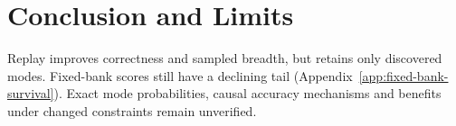 \section{Conclusion and Limits}
\label{sec:conclusion}\label{sec:discussion}\label{sec:limitations}
Replay improves correctness and sampled breadth, but retains only discovered
modes. Fixed-bank scores still have a declining tail
(Appendix~\ref{app:fixed-bank-survival}). Exact mode probabilities, causal
accuracy mechanisms and benefits under changed constraints remain unverified.

\label{main:lastpage}
\clearpage


\clearpage
\appendix


